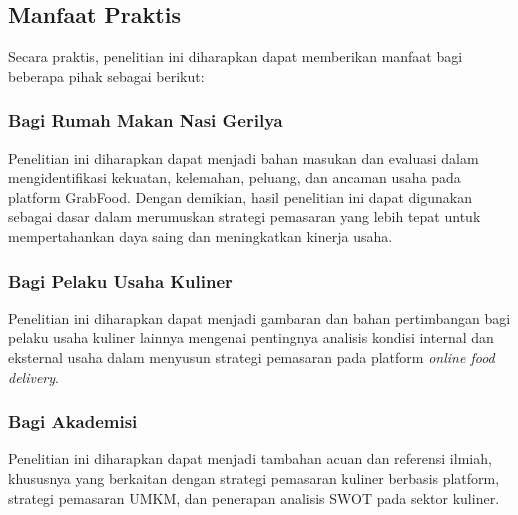 \subsection{Manfaat Praktis}
Secara praktis, penelitian ini diharapkan dapat memberikan manfaat bagi beberapa pihak sebagai berikut:
\subsubsection{Bagi Rumah Makan Nasi Gerilya}
\noindent Penelitian ini diharapkan dapat menjadi bahan masukan dan evaluasi dalam mengidentifikasi kekuatan, kelemahan, peluang, dan ancaman usaha pada platform GrabFood. Dengan demikian, hasil penelitian ini dapat digunakan sebagai dasar dalam merumuskan strategi pemasaran yang lebih tepat untuk mempertahankan daya saing dan meningkatkan kinerja usaha.
\subsubsection{Bagi Pelaku Usaha Kuliner}
\noindent Penelitian ini diharapkan dapat menjadi gambaran dan bahan pertimbangan bagi pelaku usaha kuliner lainnya mengenai pentingnya analisis kondisi internal dan eksternal usaha dalam menyusun strategi pemasaran pada platform \textit{online food delivery}.
\subsubsection{Bagi Akademisi}
\noindent Penelitian ini diharapkan dapat menjadi tambahan acuan dan referensi ilmiah, khususnya yang berkaitan dengan strategi pemasaran kuliner berbasis platform, strategi pemasaran UMKM, dan penerapan analisis SWOT pada sektor kuliner.
